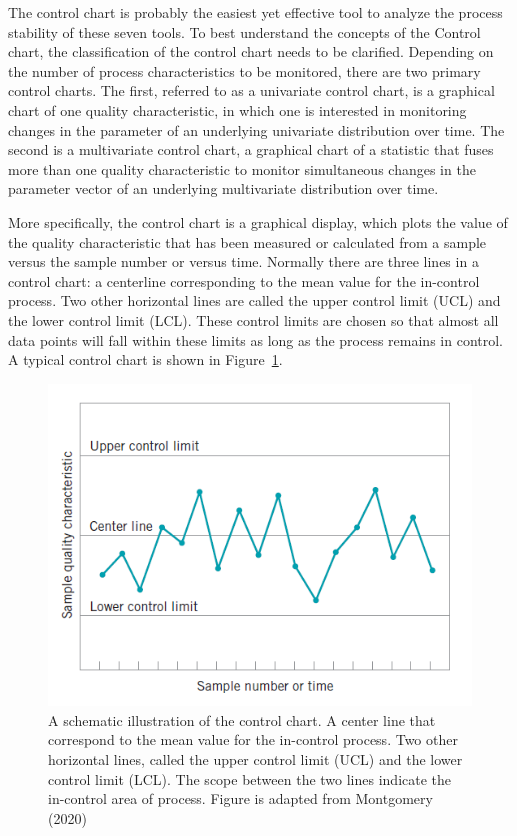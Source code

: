 The control chart is probably the easiest yet effective tool to analyze the process stability of these seven tools. To best understand the concepts of the Control chart, the classification of the control chart needs to be clarified. Depending on the number of process characteristics to be monitored, there are two primary control charts. The first, referred to as a univariate control chart, is a graphical chart of one quality characteristic, in which one is interested in monitoring changes in the parameter of an underlying univariate distribution
over time. The second is a multivariate control chart, a graphical chart of a statistic that fuses more than one quality characteristic to monitor simultaneous changes in the parameter
vector of an underlying multivariate distribution over time.


More specifically, the control chart is a graphical display, which plots the value of the quality characteristic that has been measured or calculated from a sample versus the sample number or versus time. Normally there are three lines in a control chart: a centerline corresponding to the mean value for the in-control process. Two other horizontal lines are called the upper control limit (UCL) and the lower control limit (LCL). These control limits are chosen so that almost all data points will fall within these limits as long as the process remains in control. A typical control chart is shown in Figure~\ref{fig:control_chart}.

\begin{figure}[h]
\centering
\includegraphics[width=1\textwidth]{images/control_chart.PNG}
\caption[A typical control chart.]{A schematic illustration of the control chart. A center line that correspond to the mean value for the in-control process. Two other horizontal lines, called the upper control limit (UCL) and the lower control limit (LCL). The scope between the two lines indicate the in-control area of process. Figure is adapted from Montgomery (2020)}
\label{fig:control_chart}
\end{figure}

